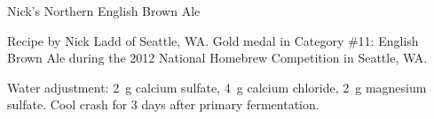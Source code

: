 \begin{recipe}{Nick's Northern English Brown Ale}

\begin{aboutblock}
Recipe by Nick Ladd of Seattle, WA. Gold medal in Category \#11: English Brown Ale
during the 2012 National Homebrew Competition in Seattle, WA. \sourceaha
\end{aboutblock}


\begin{methodandtiming}

\begin{mashsteps}
\end{mashsteps}

\begin{fermentationsteps}
\end{fermentationsteps}

\begin{directions}
Water adjustment: 2~g calcium sulfate, 4~g calcium chloride, 2~g magnesium sulfate.
Cool crash for 3 days after primary fermentation. 
\end{directions}

\end{methodandtiming}

\recipebreak

\begin{ingredientsblock}

\begin{malts}
\end{malts}

\begin{hops}
\end{hops}


\end{ingredientsblock}

\end{recipe}

